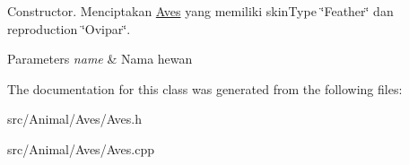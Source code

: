 Constructor. Menciptakan \hyperlink{classAves}{Aves} yang memiliki skin\+Type \char`\"{}\+Feather\char`\"{} dan reproduction \char`\"{}\+Ovipar\char`\"{}. 


\begin{DoxyParams}{Parameters}
{\em name} & Nama hewan \\
\hline
\end{DoxyParams}


The documentation for this class was generated from the following files\+:\begin{DoxyCompactItemize}
\item 
src/\+Animal/\+Aves/Aves.\+h\item 
src/\+Animal/\+Aves/Aves.\+cpp\end{DoxyCompactItemize}
